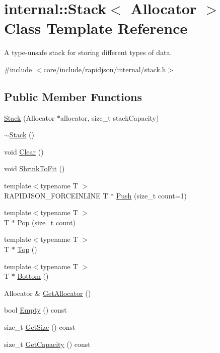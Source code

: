 \hypertarget{classinternal_1_1Stack}{}\section{internal\+:\+:Stack$<$ Allocator $>$ Class Template Reference}
\label{classinternal_1_1Stack}


A type-\/unsafe stack for storing different types of data.  




{\ttfamily \#include $<$core/include/rapidjson/internal/stack.\+h$>$}

\subsection*{Public Member Functions}
\begin{DoxyCompactItemize}
\item 
\hyperlink{classinternal_1_1Stack_af09ab91f9e5143deccf7c9af837f451e}{Stack} (Allocator $\ast$allocator, size\+\_\+t stack\+Capacity)
\item 
\hyperlink{classinternal_1_1Stack_afedce84c8816abe9277a71ebd5e1808a}{$\sim$\+Stack} ()
\item 
void \hyperlink{classinternal_1_1Stack_a02da31665a372738e81ded2f7b7d598e}{Clear} ()
\item 
void \hyperlink{classinternal_1_1Stack_a3852b8494d69c91f6a238a51572e591e}{Shrink\+To\+Fit} ()
\item 
{\footnotesize template$<$typename T $>$ }\\R\+A\+P\+I\+D\+J\+S\+O\+N\+\_\+\+F\+O\+R\+C\+E\+I\+N\+L\+I\+NE T $\ast$ \hyperlink{classinternal_1_1Stack_a8038223ec0ed6ea92bb5f48e645a25ca}{Push} (size\+\_\+t count=1)
\item 
{\footnotesize template$<$typename T $>$ }\\T $\ast$ \hyperlink{classinternal_1_1Stack_a8545a8ccba595ac6e4ade9784474aa1c}{Pop} (size\+\_\+t count)
\item 
{\footnotesize template$<$typename T $>$ }\\T $\ast$ \hyperlink{classinternal_1_1Stack_ab3ed5b4afed3c73c516678516d5e195b}{Top} ()
\item 
{\footnotesize template$<$typename T $>$ }\\T $\ast$ \hyperlink{classinternal_1_1Stack_a10aa1bc716b82cb0a40b3a3b9d5efe87}{Bottom} ()
\item 
Allocator \& \hyperlink{classinternal_1_1Stack_ab01f693833dfe136f574d66547623cfa}{Get\+Allocator} ()
\item 
bool \hyperlink{classinternal_1_1Stack_abf57d1c7b356d8acbbe0e79147ca4b5c}{Empty} () const 
\item 
size\+\_\+t \hyperlink{classinternal_1_1Stack_ade4a25fa82950619652a30aa3a807f58}{Get\+Size} () const 
\item 
size\+\_\+t \hyperlink{classinternal_1_1Stack_a61dea1ed780c07bb438d17c581ab0e48}{Get\+Capacity} () const 
\end{DoxyCompactItemize}


